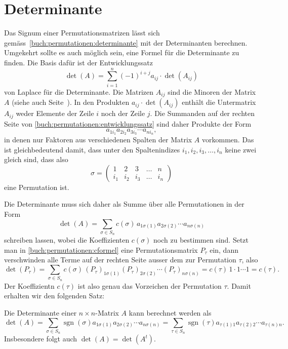 %
%
%
\section{Determinante
\label{buch:section:determinante}}
Das Signum einer Permutationsmatrizen lässt sich
gemäss~\eqref{buch:permutationen:determinante}
mit der Determinanten berechnen.
Umgekehrt sollte es auch möglich sein, eine Formel
für die Determinante zu finden.
Die Basis dafür ist der
Entwicklungssatz 
\begin{equation}
\det(A)
=
\sum_{i=1}^n (-1)^{i+j} a_{i\!j} \cdot \det(A_{i\!j})
\label{buch:permutationen:entwicklungssatz}
\end{equation}
von Laplace für die Determinante.
%
%
Die Matrizen $A_{i\!j}$ sind die Minoren der Matrix $A$
(siehe auch Seite~\pageref{buch:linear:def:minor}).
In den Produkten $a_{i\!j}\cdot\det(A_{i\!j})$ enthält 
die Untermatrix $A_{i\!j}$ weder Elemente der Zeile $i$ noch der 
Zeile $j$.
Die Summanden auf der rechten Seite von
\eqref{buch:permutationen:entwicklungssatz}
sind daher Produkte der Form
\[
a_{1i_1}
a_{2i_2}
a_{3i_3}
\cdots
a_{ni_n},
\]
in denen nur Faktoren aus verschiedenen Spalten der Matrix $A$
vorkommen.
Das ist gleichbedeutend damit, dass unter den Spaltenindizes
$i_1,i_2,i_3,\dots,i_n$ keine zwei gleich sind, dass also
\[
\sigma
=
\begin{pmatrix}
1&2&3&\dots&n\\
i_1&i_2&i_3&\dots&i_n
\end{pmatrix}
\]
eine Permutation ist.

Die Determinante muss sich daher als Summe über alle Permutationen
in der Form
\begin{equation}
\det(A)
=
\sum_{\sigma\in S_n} 
c(\sigma)
\,
a_{1\sigma(1)}
a_{2\sigma(2)}
\cdots
a_{n\sigma(n)}
\label{buch:permutationen:cformel}
\end{equation}
schreiben lassen, wobei die Koeffizienten $c(\sigma)$ noch zu bestimmen
sind.
Setzt man in
\eqref{buch:permutationen:cformel}
eine Permutationsmatrix $P_\tau$ ein, dann verschwinden alle
Terme auf der rechten Seite ausser dem zur Permutation $\tau$,
also
\[
\det(P_\tau)
=
\sum_{\sigma \in S_n}
c(\sigma)
\,
(P_\tau)_{1\sigma(1)}
(P_\tau)_{2\sigma(2)}
\cdots
(P_\tau)_{n\sigma(n)}
=
c(\tau)
\,
1\cdot 1\cdots 1
=
c(\tau).
\]
Der Koeffizientn $c(\tau)$ ist also genau das Vorzeichen
der Permutation $\tau$.
Damit erhalten wir den folgenden Satz:

\begin{satz}
Die Determinante einer $n\times n$-Matrix $A$ kann berechnet werden als
\[
\det(A)
=
\sum_{\sigma\in S_n}
\operatorname{sgn}(\sigma)
a_{1\sigma(1)}
a_{2\sigma(2)}
\cdots
a_{n\sigma(n)}
=
\sum_{\tau\in S_n}
\operatorname{sgn}(\tau)
a_{\tau(1)1}
a_{\tau(2)2}
\cdots
a_{\tau(n)n}.
\]
Insbesondere folgt auch $\det(A)=\det(A^t)$.
\end{satz}

